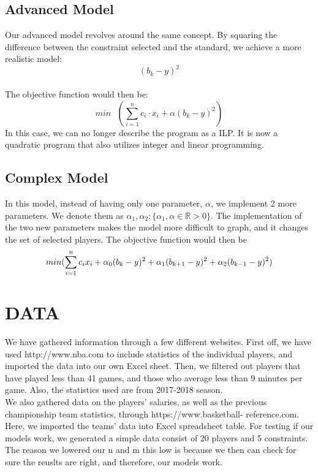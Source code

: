 \documentclass{article}
\begin{document}
 
\subsection{Advanced Model}
Our advanced model revolves around the same concept. By squaring the difference between the constraint selected and the standard, we achieve a more realistic model:
\begin{equation}\label{eq_for_quard_penalty}
(b_k - y)^2
\end{equation} \\
The objective function would then be:
\begin{equation}\label{eq_for_simple_model_objective_function}
min \text{ } (\sum^{n}_{i=1}{c_i \cdot x_i}  + \alpha(b_k 
- y)^2)\end{equation}
In this case, we can no longer describe the program as a ILP. It is now a 
quadratic program that also utilizes integer and linear programming.
\subsection{Complex Model}
In this model, instead of having only one parameter, $\alpha$, we 
implement 2 more parameters. We denote them as $\alpha_1, \alpha_2: \{\alpha_1, 
\alpha \in \mathbb{R}{> 0}\}$. The implementation of the two new 
parameters makes the model more difficult to graph, and it changes the set 
of selected players.
The objective function would then be 
$$min (\sum_{i=1}^ {n} \space c_i x_i \space + \alpha_0 \space 
(b_k \space - y)^2+ \alpha_1 \space (b_{k+1} \space - y)^2 
+\alpha_2 \space 
(b_{k-1} \space - y)^2) $$






\section{\centering DATA}
We have gathered information through a few different websites. First off, 
we have used http://www.nba.com to include statistics of the individual 
players, and imported the data into our own Excel sheet. Then, we filtered 
out players that have played less than 41 games, and those who average 
less than 9 minutes per game. Also, the statistics used are from 2017-2018 
season. \\
We also gathered data on the players' salaries, as well as the previous 
championship team statistics, through https://www.basketball-
reference.com. Here, we imported the teams' data into Excel spreadsheet 
table. For testing if our models work, we generated a simple data consist of 20 players and 5 constraints. The reason we lowered our n and m this low is because we then can check for sure the reuslts are right, and therefore, our models work. 
\end{document}
